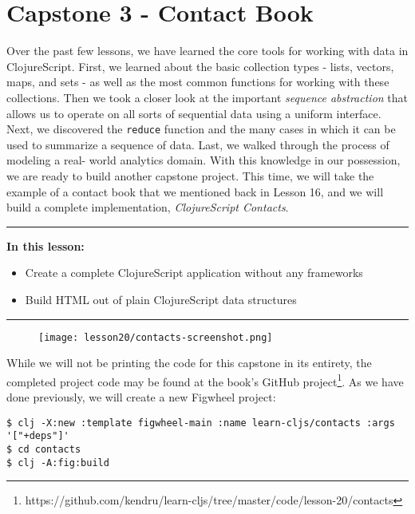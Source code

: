 \documentclass[10pt,twoside,openright]{memoir}
\begin{document}
\chapter{Capstone 3 - Contact Book}

Over the past few lessons, we have learned the core tools for working
with data in ClojureScript. First, we learned about the basic collection
types - lists, vectors, maps, and sets - as well as the most common
functions for working with these collections. Then we took a closer look
at the important \emph{sequence abstraction} that allows us to operate
on all sorts of sequential data using a uniform interface. Next, we
discovered the \texttt{reduce} function and the many cases in which it
can be used to summarize a sequence of data. Last, we walked through the
process of modeling a real- world analytics domain. With this knowledge
in our possession, we are ready to build another capstone project. This
time, we will take the example of a contact book that we mentioned back
in Lesson 16, and we will build a complete implementation,
\emph{ClojureScript Contacts}.

\begin{center}\rule{0.5\linewidth}{0.5pt}\end{center}

\textbf{In this lesson:}

\begin{itemize}
\tightlist
\item
  Create a complete ClojureScript application without any frameworks
\item
  Build HTML out of plain ClojureScript data structures
\end{itemize}

\begin{center}\rule{0.5\linewidth}{0.5pt}\end{center}

\begin{figure}[H]
\centering
\texttt{[image: lesson20/contacts-screenshot.png]}
\end{figure}


While we will not be printing the code for this capstone in its entirety, the completed project code may be found at the book's GitHub project\footnote{https://github.com/kendru/learn-cljs/tree/master/code/lesson-20/contacts}. As we have done previously, we will create a new Figwheel project:

\begin{verbatim}
$ clj -X:new :template figwheel-main :name learn-cljs/contacts :args '["+deps"]'
$ cd contacts
$ clj -A:fig:build
\end{verbatim}
\end{document}
